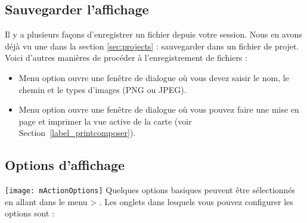 \subsection{Sauvegarder l'affichage}\label{sec:output}
Il y a plusieurs façons d'enregistrer un fichier depuis votre session. Nous en avons déjà vu une dans la section \ref{sec:projects} : sauvegarder dans un fichier de projet.
Voici d'autres manières de procéder à l'enregistrement de fichiers :
\begin{itemize}
\item Menu option  ouvre une fenêtre de dialogue où vous devez saisir le nom, le chemin et le types d'images (PNG ou JPEG).
\item Menu option  ouvre une fenêtre de dialogue où vous pouvez faire une mise en page et imprimer la vue active de la carte (voir Section~\ref{label_printcomposer}).
\end{itemize}


\subsection{Options d'affichage}
\label{subsec:gui_options}
\texttt{[image: mActionOptions]} 
Quelques options basiques peuvent être sélectionnés en allant dans le menu  >
. Les onglets dans lesquels vous pouvez configurer les options sont :

